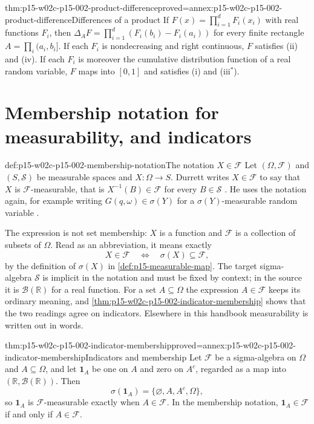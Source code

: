 \begin{hblemma}{thm:p15-w02c-p15-002-product-difference}{proved=annex:p15-w02c-p15-002-product-difference}{Differences of a product}
If \(F(x)=\prod_{i=1}^dF_i(x_i)\) with real functions \(F_i\), then
\(\Delta_AF=\prod_{i=1}^d(F_i(b_i)-F_i(a_i))\) for every finite rectangle
\(A=\prod_i(a_i,b_i]\). If each \(F_i\) is nondecreasing and right
continuous, \(F\) satisfies (ii) and (iv). If each \(F_i\) is moreover
the cumulative distribution function of a real random variable, \(F\)
maps into \([0,1]\) and satisfies (i) and (iii\(^*\)).
\end{hblemma}

\section{Membership notation for measurability, and indicators}
\label{sec:p15-w02c-p15-002-notation}

\begin{hbconvention}{def:p15-w02c-p15-002-membership-notation}{The notation \(X\in\mathcal F\)}
Let \((\Omega,\mathcal F)\) and \((S,\mathcal S)\) be measurable spaces and
\(X:\Omega\to S\). Durrett writes \(X\in\mathcal F\) to say that \(X\) is
\(\mathcal F\)-measurable, that is \(X^{-1}(B)\in\mathcal F\) for every
\(B\in\mathcal S\) \cite[p.~10]{DurrettPTEAuthor2019}. He uses the
notation again, for example writing \(G(q,\omega)\in\sigma(Y)\) for a
\(\sigma(Y)\)-measurable random variable \cite[p.~215]{DurrettPTEAuthor2019}.

The expression is not set membership: \(X\) is a function and
\(\mathcal F\) is a collection of subsets of \(\Omega\). Read as an
abbreviation, it means exactly
\[
 X\in\mathcal F\quad\Longleftrightarrow\quad\sigma(X)\subseteq\mathcal F ,
\]
by the definition of \(\sigma(X)\) in \cref{def:p15-measurable-map}. The
target sigma-algebra \(\mathcal S\) is implicit in the notation and must
be fixed by context; in the source it is \(\mathcal B(\mathbb R)\) for a
real function. For a set \(A\subseteq\Omega\) the expression
\(A\in\mathcal F\) keeps its ordinary meaning, and
\cref{thm:p15-w02c-p15-002-indicator-membership} shows that the two
readings agree on indicators. Elsewhere in this handbook measurability is
written out in words.
\end{hbconvention}

\begin{hblemma}{thm:p15-w02c-p15-002-indicator-membership}{proved=annex:p15-w02c-p15-002-indicator-membership}{Indicators and membership}
Let \(\mathcal F\) be a sigma-algebra on \(\Omega\) and
\(A\subseteq\Omega\), and let \(\mathbf1_A\) be one on \(A\) and zero on
\(A^c\), regarded as a map into \((\mathbb R,\mathcal B(\mathbb R))\).
Then
\[
 \sigma(\mathbf1_A)=\{\varnothing,A,A^c,\Omega\},
\]
so \(\mathbf1_A\) is \(\mathcal F\)-measurable exactly when
\(A\in\mathcal F\). In the membership notation,
\(\mathbf1_A\in\mathcal F\) if and only if \(A\in\mathcal F\).
\end{hblemma}

